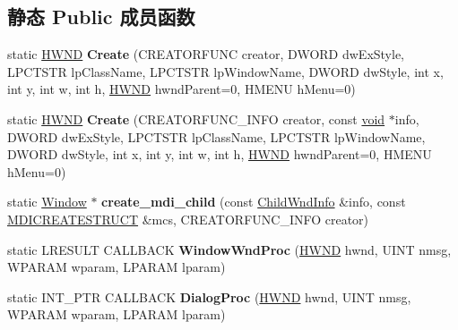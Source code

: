 \subsection*{静态 Public 成员函数}
\begin{DoxyCompactItemize}
\item 
\mbox{\label{struct_window_a5049ed0b95f7903f3f54922e9dc5a5a1}} 
static \hyperlink{interfacevoid}{H\+W\+ND} {\bfseries Create} (C\+R\+E\+A\+T\+O\+R\+F\+U\+NC creator, D\+W\+O\+RD dw\+Ex\+Style, L\+P\+C\+T\+S\+TR lp\+Class\+Name, L\+P\+C\+T\+S\+TR lp\+Window\+Name, D\+W\+O\+RD dw\+Style, int x, int y, int w, int h, \hyperlink{interfacevoid}{H\+W\+ND} hwnd\+Parent=0, H\+M\+E\+NU h\+Menu=0)
\item 
\mbox{\label{struct_window_a0f92405eea25aaf8ce7fa8802d58e630}} 
static \hyperlink{interfacevoid}{H\+W\+ND} {\bfseries Create} (C\+R\+E\+A\+T\+O\+R\+F\+U\+N\+C\+\_\+\+I\+N\+FO creator, const \hyperlink{interfacevoid}{void} $\ast$info, D\+W\+O\+RD dw\+Ex\+Style, L\+P\+C\+T\+S\+TR lp\+Class\+Name, L\+P\+C\+T\+S\+TR lp\+Window\+Name, D\+W\+O\+RD dw\+Style, int x, int y, int w, int h, \hyperlink{interfacevoid}{H\+W\+ND} hwnd\+Parent=0, H\+M\+E\+NU h\+Menu=0)
\item 
\mbox{\label{struct_window_a784c808ae04b80688625778bc9ca8080}} 
static \hyperlink{struct_window}{Window} $\ast$ {\bfseries create\+\_\+mdi\+\_\+child} (const \hyperlink{struct_child_wnd_info}{Child\+Wnd\+Info} \&info, const \hyperlink{structtag_m_d_i_c_r_e_a_t_e_s_t_r_u_c_t_a}{M\+D\+I\+C\+R\+E\+A\+T\+E\+S\+T\+R\+U\+CT} \&mcs, C\+R\+E\+A\+T\+O\+R\+F\+U\+N\+C\+\_\+\+I\+N\+FO creator)
\item 
\mbox{\label{struct_window_ae5f7c6dd85acc57d057678f660662dd5}} 
static L\+R\+E\+S\+U\+LT C\+A\+L\+L\+B\+A\+CK {\bfseries Window\+Wnd\+Proc} (\hyperlink{interfacevoid}{H\+W\+ND} hwnd, U\+I\+NT nmsg, W\+P\+A\+R\+AM wparam, L\+P\+A\+R\+AM lparam)
\item 
\mbox{\label{struct_window_a428a84a8d80636bc184ffeeb768adeb3}} 
static I\+N\+T\+\_\+\+P\+TR C\+A\+L\+L\+B\+A\+CK {\bfseries Dialog\+Proc} (\hyperlink{interfacevoid}{H\+W\+ND} hwnd, U\+I\+NT nmsg, W\+P\+A\+R\+AM wparam, L\+P\+A\+R\+AM lparam)
\item 
\mbox{\label{struct_window_aedcf41dd85e154e67c5ae03a247b387d}} 

\end{DoxyCompactItemize}
